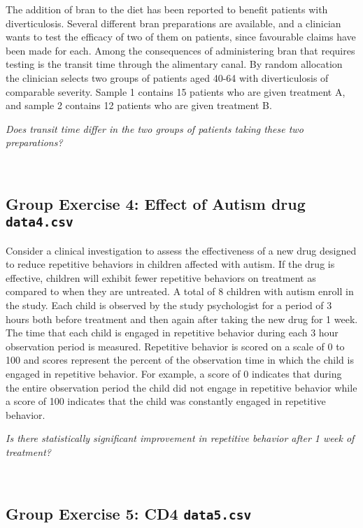 \documentclass[]{article}
\begin{document}
The addition of bran to the diet has been reported to benefit patients
with diverticulosis. Several different bran preparations are available,
and a clinician wants to test the efficacy of two of them on patients,
since favourable claims have been made for each. Among the consequences
of administering bran that requires testing is the transit time through
the alimentary canal. By random allocation the clinician selects two
groups of patients aged 40-64 with diverticulosis of comparable
severity. Sample 1 contains 15 patients who are given treatment A, and
sample 2 contains 12 patients who are given treatment B.

{\emph{Does transit time differ in the two groups of patients taking
these two preparations?}}

~

\hypertarget{group-exercise-4-effect-of-autism-drug-data4.csv}{%
\subsection{\texorpdfstring{Group Exercise 4: Effect of Autism drug
\texttt{data4.csv}}{Group Exercise 4: Effect of Autism drug data4.csv}}\label{group-exercise-4-effect-of-autism-drug-data4.csv}}

Consider a clinical investigation to assess the effectiveness of a new
drug designed to reduce repetitive behaviors in children affected with
autism. If the drug is effective, children will exhibit fewer repetitive
behaviors on treatment as compared to when they are untreated. A total
of 8 children with autism enroll in the study. Each child is observed by
the study psychologist for a period of 3 hours both before treatment and
then again after taking the new drug for 1 week. The time that each
child is engaged in repetitive behavior during each 3 hour observation
period is measured. Repetitive behavior is scored on a scale of 0 to 100
and scores represent the percent of the observation time in which the
child is engaged in repetitive behavior. For example, a score of 0
indicates that during the entire observation period the child did not
engage in repetitive behavior while a score of 100 indicates that the
child was constantly engaged in repetitive behavior.

{\emph{Is there statistically significant improvement in repetitive
behavior after 1 week of treatment?}}

~

\hypertarget{group-exercise-5-cd4-data5.csv}{%
\subsection{\texorpdfstring{Group Exercise 5: CD4
\texttt{data5.csv}}{Group Exercise 5: CD4 data5.csv}}\label{group-exercise-5-cd4-data5.csv}}
\end{document}
